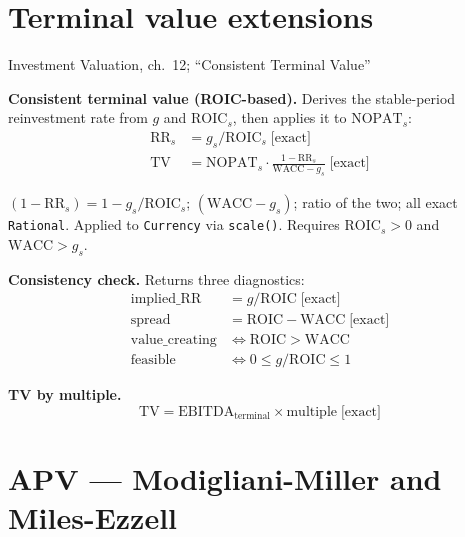 \documentclass[11pt, a4paper, oneside]{article}
\newcommand{\WACC}{\mathrm{WACC}}
\newcommand{\NOPAT}{\mathrm{NOPAT}}
\newcommand{\ROIC}{\mathrm{ROIC}}
\newcommand{\TV}{\mathrm{TV}}
\newcommand{\RR}{\mathrm{RR}}
\newcommand{\exact}{\;\text{[exact]}}
\begin{document}
\section{Terminal value extensions}
\label{sec:terminal}

\begin{damodaran}{Investment Valuation, ch.~12; ``Consistent Terminal Value''}
\end{damodaran}

\textbf{Consistent terminal value (ROIC-based).}
Derives the stable-period reinvestment rate from $g$ and $\ROIC_s$, then
applies it to $\NOPAT_s$:
\begin{align}
  \RR_s &= g_s / \ROIC_s \exact\\
  \TV &= \NOPAT_s \cdot \frac{1 - \RR_s}{\WACC - g_s} \exact
  \label{eq:tv_consistent}
\end{align}

\begin{impl}{}
$(1-\RR_s) = 1 - g_s/\ROIC_s$; $(\WACC - g_s)$; ratio of the two; all exact
\texttt{Rational}. Applied to \texttt{Currency} via \texttt{scale()}.
Requires $\ROIC_s > 0$ and $\WACC > g_s$.
\end{impl}

\textbf{Consistency check.} Returns three diagnostics:
\begin{align*}
  \mathrm{implied\_RR} &= g / \ROIC \exact\\
  \mathrm{spread} &= \ROIC - \WACC \exact\\
  \mathrm{value\_creating} &\Leftrightarrow \ROIC > \WACC\\
  \mathrm{feasible} &\Leftrightarrow 0 \leq g/\ROIC \leq 1
\end{align*}

\textbf{TV by multiple.}
\begin{equation}
  \TV = \mathrm{EBITDA}_\text{terminal} \times \text{multiple}
  \exact
\end{equation}

\section{APV --- Modigliani-Miller and Miles-Ezzell}
\label{sec:apv}
\end{document}
